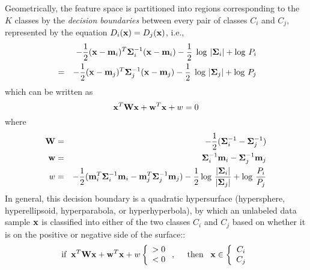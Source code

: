 \documentclass{article}
\begin{document}
Geometrically, the feature space is partitioned into regions corresponding 
to the $K$ classes by the {\em decision boundaries} between every pair of 
classes $C_i$ and $C_j$, represented by the equation $D_i({\bf x})=D_j({\bf x})$,
i.e.,
\begin{eqnarray}
  &&-\frac{1}{2}({\bf x}-{\bf m}_i)^T{\bf \Sigma}_i^{-1}({\bf x}-{\bf m}_i)
  -\frac{1}{2}\;\log\,|{\bf \Sigma}_i | + \log\, P_i 	
  \nonumber\\
  &=&-\frac{1}{2}({\bf x}-{\bf m}_j)^T{\bf \Sigma}_j^{-1}({\bf x}-{\bf m}_j)
  -\frac{1}{2}\;\log\,|{\bf \Sigma}_j | + \log\, P_j 
\end{eqnarray}
which can be written as
\begin{equation}
  {\bf x}^T{\bf W}{\bf x}+{\bf w}^T{\bf x}+w=0
\end{equation}
where
\begin{eqnarray}
  {\bf W}&=&-\frac{1}{2}({\bf \Sigma}_i^{-1}-{\bf \Sigma}_j^{-1})	
  \nonumber\\
  {\bf w}&=&{\bf \Sigma}_i^{-1}{\bf m}_i-{\bf \Sigma}_j^{-1}{\bf m}_j
  \nonumber\\	
  w&=&-\frac{1}{2}({\bf m}_i^T{\bf \Sigma}_i^{-1}{\bf m}_i-{\bf m}_j^T{\bf \Sigma}_j^{-1}{\bf m}_j)
  -\frac{1}{2}\log\,\frac{|{\bf \Sigma}_i|}{|{\bf \Sigma}_j|}
  +\log\,\frac{P_i}{P_j}
  \label{Www2}
\end{eqnarray}
In general, this decision boundary is a quadratic hypersurface
(hypersphere, hyperellipsoid, hyperparabola, or hyperhyperbola), by 
which an unlabeled data sample ${\bf x}$ is classified into either of 
the two classes $C_i$ and $C_j$ based on whether it is on the positive
or negative side of the surface::
\begin{equation}
  \mbox{if}\;\;{\bf x}^T{\bf W}{\bf x}+{\bf w}^T{\bf x}+w
  \left\{\begin{array}{l}>0\\<0\end{array}\right.,\;\;\;\;\;
  \mbox{then}\;\;\; {\bf x}\in \left\{\begin{array}{c}
  C_i\\ C_j  \end{array}\right.
  \label{MLdiscriminant}
\end{equation}
\end{document}
